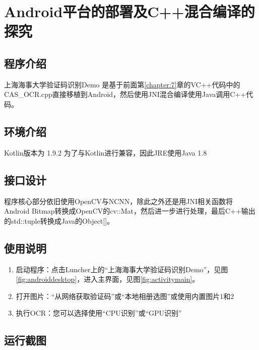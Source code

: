 \newpage
\chapter{Android平台的部署及C++混合编译的探究}
\label{chapter:9}

\section{程序介绍}

上海海事大学验证码识别Demo 是基于前面第\ref{chapter:7}章的VC++代码中的CAS\_OCR.cpp直接移植到Android，然后使用JNI混合编译使用Java调用C++代码。

\section{环境介绍}

Kotlin版本为 1.9.2
为了与Kotlin进行兼容，因此JRE使用Java 1.8

\section{接口设计}

程序核心部分依旧使用OpenCV与NCNN，除此之外还是用JNI相关函数将Android Bitmap转换成OpenCV的cv::Mat，然后进一步进行处理，最后C++输出的std::tuple转换成Java的Object[]。

\section{使用说明}

\begin{enumerate}
	\item 启动程序：点击Luncher上的“上海海事大学验证码识别Demo”，见图\ref{fig:androiddesktop}，进入主界面，见图\ref{fig:activitymain}。
	\item 打开图片：“从网络获取验证码”或“本地相册选图”或使用内置图片1和2
	\item 执行OCR：您可以选择使用“CPU识别”或“GPU识别”
\end{enumerate}

\section{运行截图}

